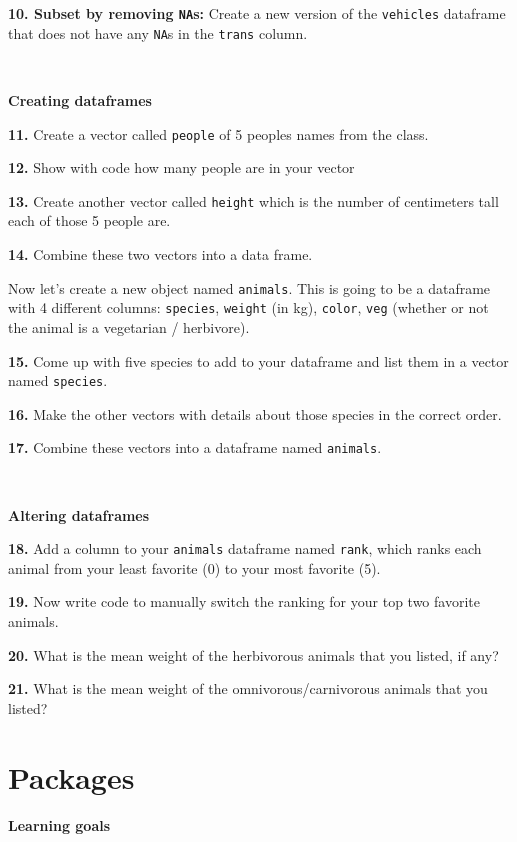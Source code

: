 \documentclass[]{book}
\begin{document}
\textbf{10. Subset by removing \texttt{NA}s:} Create a new version of the \texttt{vehicles} dataframe that does not have any \texttt{NA}s in the \texttt{trans} column.

~

\textbf{Creating dataframes}

\textbf{11.} Create a vector called \texttt{people} of 5 peoples names from the class.

\textbf{12.} Show with code how many people are in your vector

\textbf{13.} Create another vector called \texttt{height} which is the number of centimeters tall each of those 5 people are.

\textbf{14.} Combine these two vectors into a data frame.

Now let's create a new object named \texttt{animals}. This is going to be a dataframe with 4 different columns: \texttt{species}, \texttt{weight} (in kg), \texttt{color}, \texttt{veg} (whether or not the animal is a vegetarian / herbivore).

\textbf{15.} Come up with five species to add to your dataframe and list them in a vector named \texttt{species}.

\textbf{16.} Make the other vectors with details about those species in the correct order.

\textbf{17.} Combine these vectors into a dataframe named \texttt{animals}.

~

\textbf{Altering dataframes}

\textbf{18.} Add a column to your \texttt{animals} dataframe named \texttt{rank}, which ranks each animal from your least favorite (0) to your most favorite (5).

\textbf{19.} Now write code to manually switch the ranking for your top two favorite animals.

\textbf{20.} What is the mean weight of the herbivorous animals that you listed, if any?

\textbf{21.} What is the mean weight of the omnivorous/carnivorous animals that you listed?

\hypertarget{packages}{%
\chapter{Packages}\label{packages}}

\hypertarget{learning-goals-6}{%
\subsubsection*{Learning goals}\label{learning-goals-6}}
\end{document}
